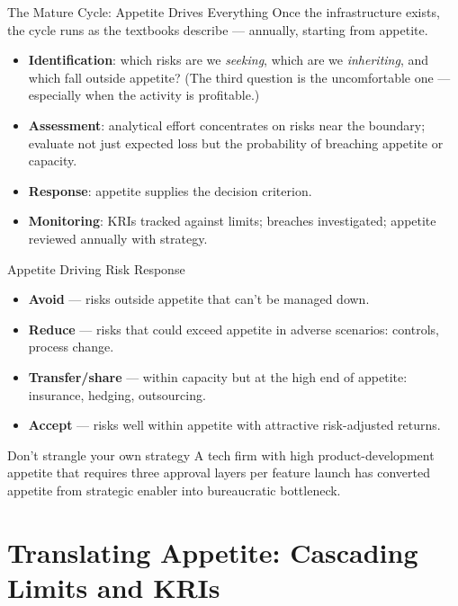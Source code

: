 \documentclass[11pt, aspectratio=169]{beamer}
\begin{document}
\begin{frame}{The Mature Cycle: Appetite Drives Everything}
Once the infrastructure exists, the cycle runs as the textbooks describe --- annually, starting from appetite.
\begin{itemize}
  \item \textbf{Identification}: which risks are we \emph{seeking}, which are we \emph{inheriting}, and which fall \alert{outside appetite}? (The third question is the uncomfortable one --- especially when the activity is profitable.)
  \item \textbf{Assessment}: analytical effort concentrates on risks near the boundary; evaluate not just expected loss but the probability of breaching appetite or capacity.
  \item \textbf{Response}: appetite supplies the decision criterion.
  \item \textbf{Monitoring}: KRIs tracked against limits; breaches investigated; appetite reviewed annually with strategy.
\end{itemize}
\end{frame}

\begin{frame}{Appetite Driving Risk Response}
\begin{itemize}
  \item \textbf{Avoid} --- risks outside appetite that can't be managed down.
  \item \textbf{Reduce} --- risks that could exceed appetite in adverse scenarios: controls, process change.
  \item \textbf{Transfer/share} --- within capacity but at the high end of appetite: insurance, hedging, outsourcing.
  \item \textbf{Accept} --- risks well within appetite with attractive risk-adjusted returns.
\end{itemize}
\medskip
\begin{block}{Don't strangle your own strategy}
A tech firm with high product-development appetite that requires three approval layers per feature launch has converted appetite from strategic enabler into bureaucratic bottleneck.
\end{block}
\end{frame}

\section{Translating Appetite: Cascading Limits and KRIs}
\end{document}
